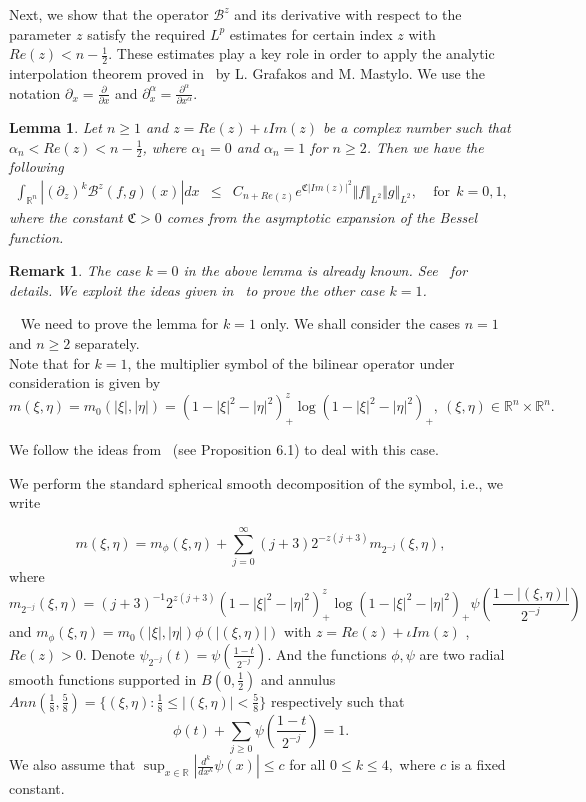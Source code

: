 \documentclass[a4paper,12pt]{amsart}
\newtheorem{lemma}[theorem]{Lemma}
\newtheorem{remark}[theorem]{Remark}
\newcommand{\R}{{\mathbb {R}}}
\begin{document}
Next, we show that the operator $\mathcal {B}^{z}$ and its derivative with respect to the parameter $z$ satisfy the required $L^p$ estimates for certain index $z$ with $Re(z)< n-\frac{1}{2}$. These estimates play a key role in order to apply the analytic interpolation theorem proved in~\cite{LM} by L. Grafakos and M. Mastylo. We use the notation $\partial_x=\frac{\partial}{\partial x}$ and $\partial^{\alpha}_x=\frac{\partial^{\alpha}}{\partial x^{\alpha}}.$
\begin{lemma}\label{keylem1}
Let $n\geq 1$ and $z=Re(z)+\iota Im(z)$ be a complex number such that $\alpha_n< Re(z)< n-\frac{1}{2}$, where $\alpha_1=0$ and $\alpha_n=1$ for $n\geq 2$.  Then we have the following
\begin{eqnarray*} \int_{\mathbb{R}^n} |\left(\partial_z\right)^k \mathcal {B}^{z}(f,g)(x)| dx &\leq & C_{n+Re(z)} e^{\mathfrak{C} \vert Im(z)\vert^{2}}\Vert f\Vert_{L^{2}}\Vert g\Vert_{L^{2}}, \ \ \ \ ~\text{for}~\  k=0,1,
\end{eqnarray*}
where the constant $\mathfrak{C}>0$ comes from the asymptotic expansion of the Bessel function.
\end{lemma}
\begin{remark} The case $k=0$ in the above lemma is already known. See~\cite{Bern1, Lee2} for details. We exploit the ideas given in~\cite{FP,Bern1} to prove the other case  $k=1$. 
\end{remark}
~ We need to prove the lemma for $k=1$ only. We shall consider the cases $n=1$ and $n\geq 2$ separately. \\
Note that for $k=1$, the multiplier symbol of the bilinear operator under consideration is given by 
$$m(\xi,\eta)=m_{0}(|\xi|, |\eta|)=(1- |\xi|^{2}-|\eta|^{2})^{z}_{+}\log(1- |\xi|^{2}-|\eta|^{2})_{+},~(\xi,\eta)\in \R^n\times \R^n.$$

 We follow the ideas from~\cite{FP} (see Proposition 6.1) to deal with this case. 

We perform the standard spherical smooth decomposition of the symbol, i.e., we write 

$$m(\xi,\eta)=m_{\phi}(\xi,\eta)+\sum\limits_{j=0}^{\infty} (j+3) 2^{-z(j+3)} m_{2^{-j}}(\xi,\eta),$$
where  
$$m_{2^{-j}}(\xi,\eta)=(j+3)^{-1} 2^{z(j+3)}(1- |\xi|^{2}-|\eta|^{2})^{z}_{+}\log(1- |\xi|^{2}-|\eta|^{2})_{+}\psi\left(\frac{1-|(\xi,\eta)|}{2^{-j}}\right)$$ and  $m_{\phi}(\xi,\eta)=m_{0}(|\xi|,|\eta|)\phi(|(\xi,\eta)|)$ with  $z=Re(z)+\iota Im(z)$ , $Re(z)>0$. Denote $ \psi_{2^{-j}}(t)=\psi\left(\frac{1-t}{2^{-j}}\right)$. And the functions  $\phi,\psi$ are two radial smooth functions supported in $B(0,\frac{1}{2})$ and annulus $Ann(\frac{1}{8},\frac{5}{8})=\{(\xi,\eta):\frac{1}{8}\leq |(\xi,\eta)|<\frac{5}{8}\}$ respectively such that $$\phi(t)+\sum_{j\geq0}\psi(\frac{1-t}{2^{-j}})=1.$$
We also assume that $\sup_{x\in\R}|\frac{d^k}{dx^k}\psi(x)|\leq c$ for all $0\leq k\leq 4,$ where $c$ is a fixed constant.
 
\end{document}
